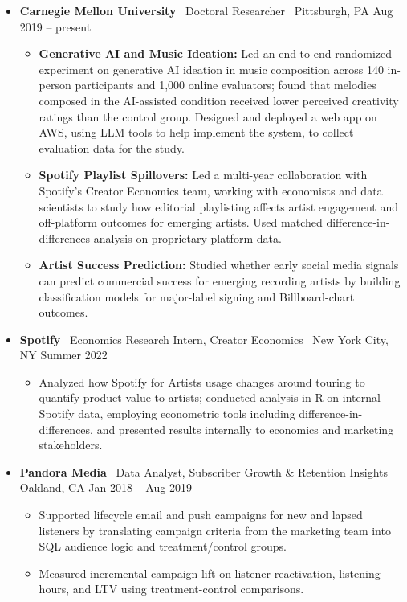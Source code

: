 \documentclass[10pt,letterpaper]{article}
\newcommand{\sep}{{\color{gray}\,\textbullet\,\,}}
\begin{document}
\begin{itemize}[leftmargin=0pt, label={}]
\item \textbf{Carnegie Mellon University} \sep Doctoral Researcher \sep Pittsburgh, PA \hfill Aug 2019 -- present
  \begin{itemize}
  \item \textbf{Generative AI and Music Ideation:} Led an end-to-end randomized experiment on generative AI ideation in music composition across 140 in-person participants and 1{,}000 online evaluators; found that melodies composed in the AI-assisted condition received lower perceived creativity ratings than the control group. Designed and deployed a web app on AWS, using LLM tools to help implement the system, to collect evaluation data for the study.
  \item \textbf{Spotify Playlist Spillovers:} Led a multi-year collaboration with Spotify's Creator Economics team, working with economists and data scientists to study how editorial playlisting affects artist engagement and off-platform outcomes for emerging artists. Used matched difference-in-differences analysis on proprietary platform data.
  \item \textbf{Artist Success Prediction:} Studied whether early social media signals can predict commercial success for emerging recording artists by building classification models for major-label signing and Billboard-chart outcomes.
  \end{itemize}
\item \textbf{Spotify} \sep Economics Research Intern, Creator Economics \sep New York City, NY \hfill Summer 2022
  \begin{itemize}
  \item Analyzed how Spotify for Artists usage changes around touring to quantify product value to artists; conducted analysis in R on internal Spotify data, employing econometric tools including difference-in-differences, and presented results internally to economics and marketing stakeholders.
  \end{itemize}
\item \textbf{Pandora Media} \sep Data Analyst, Subscriber Growth \& Retention Insights \sep Oakland, CA \hfill Jan 2018 -- Aug 2019
  \begin{itemize}
  \item Supported lifecycle email and push campaigns for new and lapsed listeners by translating campaign criteria from the marketing team into SQL audience logic and treatment/control groups.
  \item Measured incremental campaign lift on listener reactivation, listening hours, and LTV using treatment-control comparisons.

\end{itemize}
\end{itemize}
\end{document}
